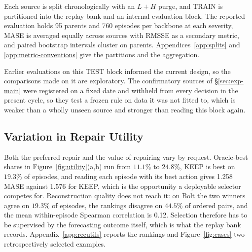 \documentclass{article}
\begin{document}
Each source is split chronologically with an $L+H$ purge, and TRAIN is partitioned into the
replay bank and an internal evaluation block. The reported evaluation holds 95 parents and 760
episodes per backbone at each severity, MASE is averaged equally across sources with RMSSE as
a secondary metric, and paired bootstrap intervals cluster on parents.
Appendices~\ref{app:splits} and \ref{app:metric-conventions} give the partitions and the
aggregation.

Earlier evaluations on this TEST block informed the current design, so the comparisons made
on it are exploratory. The confirmatory sources of \S\ref{sec:exp-main} were registered on a
fixed date and withheld from every decision in the present cycle, so they test a frozen rule
on data it was not fitted to, which is weaker than a wholly unseen source and stronger than
reading this block again.

\subsection{Variation in Repair Utility}
\label{sec:exp-exists}
Both the preferred repair and the value of repairing vary by request. Oracle-best shares in
Figure~\ref{fig:utility}(a,b) run from $11.1\%$ to $24.8\%$, KEEP is best on $19.3\%$ of
episodes, and reading each episode with its best action gives 1.258 MASE against 1.576 for
KEEP, which is the opportunity a deployable selector competes for. Reconstruction quality
does not reach it: on Bolt the two winners agree on $19.3\%$ of episodes, the rankings
disagree on $44.5\%$ of ordered pairs, and the mean within-episode Spearman correlation is
0.12. Selection therefore has to be supervised by the forecasting outcome itself, which is
what the replay bank records. Appendix~\ref{app:recutils} reports the rankings and
Figure~\ref{fig:cases} two retrospectively selected examples.
\end{document}
